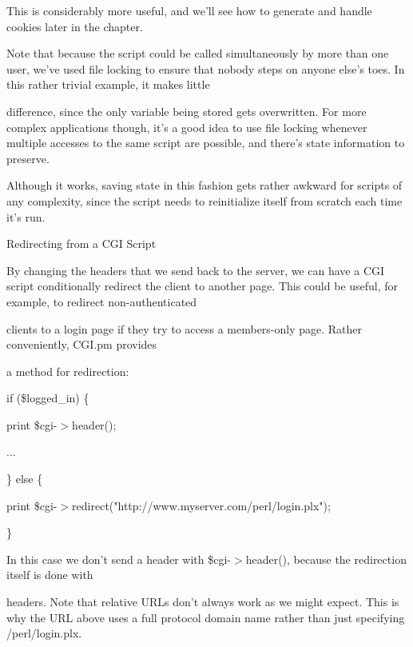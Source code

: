 \documentclass[a4paper,11pt]{book}
\begin{document}
\noindent This is considerably more useful, and we'll see how to generate and handle cookies later in the chapter.

\noindent 

\noindent Note that because the script could be called simultaneously by more than one user, we've used file locking to ensure that nobody steps on anyone else's toes. In this rather trivial example, it makes little

\noindent difference, since the only variable being stored gets overwritten. For more complex applications though, it's a good idea to use file locking whenever multiple accesses to the same script are possible, and there's state information to preserve.

\noindent 

\noindent Although it works, saving state in this fashion gets rather awkward for scripts of any complexity, since the script needs to reinitialize itself from scratch each time it's run.

\noindent 

\noindent Redirecting from a CGI Script

\noindent 

\noindent By changing the headers that we send back to the server, we can have a CGI script conditionally redirect the client to another page. This could be useful, for example, to redirect non-authenticated

\noindent clients to a login page if they try to access a members-only page. Rather conveniently, CGI.pm provides

\noindent a method for redirection:

\noindent 

\noindent if (\$logged\_in) \{

\noindent print \$cgi-$>$header();

\noindent ...

\noindent \} else \{

\noindent print \$cgi-$>$redirect("http://www.myserver.com/perl/login.plx");

\noindent \}

\noindent 

\noindent 

\noindent In this case we don't send a header with \$cgi-$>$header(), because the redirection itself is done with

\noindent headers. Note that relative URLs don't always work as we might expect. This is why the URL above uses a full protocol domain name rather than just specifying /perl/login.plx.
\end{document}
